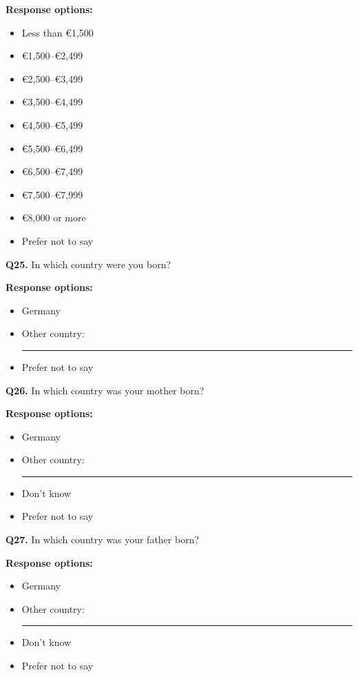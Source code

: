 \smallskip

\noindent\textbf{Response options:}
\begin{itemize}
    \item Less than €1,500
    \item €1,500--€2,499
    \item €2,500--€3,499
    \item €3,500--€4,499
    \item €4,500--€5,499
    \item €5,500--€6,499
    \item €6,500--€7,499
    \item €7,500--€7,999
    \item €8,000 or more
    \item Prefer not to say
\end{itemize}

\medskip

\noindent\textbf{Q25.}
In which country were you born?

\smallskip

\noindent\textbf{Response options:}
\begin{itemize}
    \item Germany
    \item Other country: \rule{3cm}{0.4pt}
    \item Prefer not to say
\end{itemize}

\medskip

\noindent\textbf{Q26.}
In which country was your mother born?

\smallskip

\noindent\textbf{Response options:}
\begin{itemize}
    \item Germany
    \item Other country: \rule{3cm}{0.4pt}
    \item Don't know
    \item Prefer not to say
\end{itemize}

\medskip

\noindent\textbf{Q27.}
In which country was your father born?

\smallskip

\noindent\textbf{Response options:}
\begin{itemize}
    \item Germany
    \item Other country: \rule{3cm}{0.4pt}
    \item Don't know
    \item Prefer not to say
\end{itemize}

